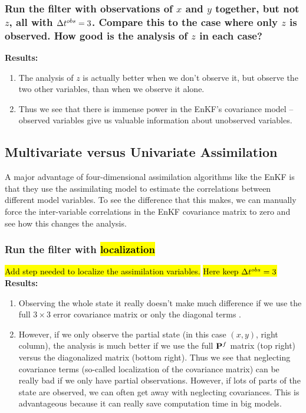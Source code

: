 \subsubsection{Run the filter with observations of $x$ and $y$ together, but not $z$, all with $\Delta t^{obs}=3$. Compare this to the case where only $z$ is observed. How good is the analysis of $z$ in each case?}  

\textbf{Results:}
\begin{enumerate}
\item The analysis of $z$ is actually better when we don't observe it, but observe the two other variables, than when we observe it alone.
\item Thus we see that there is immense power in the EnKF's covariance model -- observed variables give us valuable information about unobserved variables.
\end{enumerate}

\subsection{Multivariate versus Univariate Assimilation}

A major advantage of four-dimensional assimilation algorithms like the EnKF is that they use the assimilating model to estimate the correlations between different model variables.
To see the difference that this makes, we can manually force the inter-variable correlations in the EnKF covariance matrix to zero and see how this changes the analysis.

\subsubsection{Run the filter with \hl{localization}}  
\hl{Add step needed to localize the assimilation variables.}
\hl{Here keep $\Delta t^{obs} = 3$}
\textbf{Results:}
\begin{enumerate}
\item Observing the whole state it really doesn't make much difference if we use the full $3\times3$ error covariance matrix or only the diagonal terms .
\item However, if we only observe the partial state (in this case $(x,y)$, right column), the analysis is much better if we use the full ${\bf P}^f$ matrix (top right) versus the diagonalized matrix (bottom right).  Thus we see that neglecting covariance terms (so-called localization of the covariance matrix) can be really bad if we only have partial observations.  However, if lots of parts of the state are observed, we can often get away with neglecting covariances.  This is advantageous because it can really save computation time in big models.
\end{enumerate}

